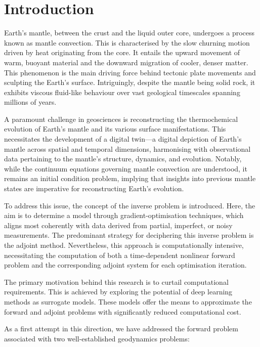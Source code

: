 \chapter{Introduction}

Earth’s mantle, between the crust and the liquid outer core, undergoes a process known as mantle convection. This is characterised by the slow churning motion driven by heat originating from the core. It entails the upward movement of warm, buoyant material and the downward migration of cooler, denser matter. This phenomenon is the main driving force behind tectonic plate movements and sculpting the Earth’s surface. Intriguingly, despite the mantle being solid rock, it exhibits viscous fluid-like behaviour over vast geological timescales spanning millions of years.

A paramount challenge in geosciences is reconstructing the thermochemical evolution of Earth’s mantle and its various surface manifestations. This necessitates the development of a digital twin—a digital depiction of Earth’s mantle across spatial and temporal dimensions, harmonising with observational data pertaining to the mantle’s structure, dynamics, and evolution. Notably, while the continuum equations governing mantle convection are understood, it remains an initial condition problem, implying that insights into previous mantle states are imperative for reconstructing Earth’s evolution.

To address this issue, the concept of the inverse problem is introduced. Here, the aim is to determine a model through gradient-optimisation techniques, which aligns most coherently with data derived from partial, imperfect, or noisy measurements. The predominant strategy for deciphering this inverse problem is the adjoint method. Nevertheless, this approach is computationally intensive, necessitating the computation of both a time-dependent nonlinear forward problem and the corresponding adjoint system for each optimisation iteration.

The primary motivation behind this research is to curtail computational requirements. This is achieved by exploring the potential of deep learning methods as surrogate models. These models offer the means to approximate the forward and adjoint problems with significantly reduced computational cost.

As a first attempt in this direction, we have addressed the forward problem associated with two well-established geodynamics problems: 

